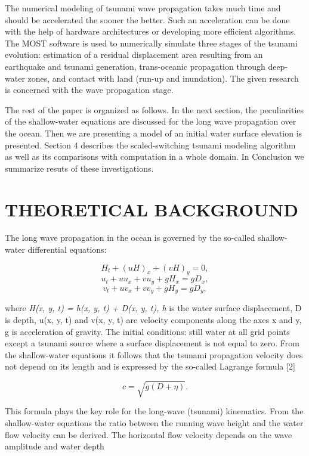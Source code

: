 \documentclass{aip-cp}
\begin{document}
The numerical modeling of tsunami wave propagation takes much time and 
should be accelerated the sooner the better. Such an acceleration can be 
done with the help of hardware architectures or developing more efficient 
algorithms. The MOST software is used to numerically simulate three 
stages of the tsunami evolution: estimation of a residual displacement 
area resulting from an earthquake and tsunami generation, trans-oceanic 
propagation through deep-water zones, and contact with land (run-up and 
inundation). The given research is concerned with the wave propagation 
stage. 

The rest of the paper is organized as follows. In the next section, the
peculiarities of the shallow-water equations are discussed for the long wave propagation 
over the ocean. Then we are presenting a model of an initial water surface elevation
is presented. Section 4 describes the scaled-switching tsunami modeling
algorithm as well as its comparisons with computation in a whole domain. In
Conclusion we summarize resuts of these investigations. 

\section{THEORETICAL BACKGROUND}
The long wave propagation in the ocean is governed by the so-called 
shallow-water differential equations:

\[
H_t + (uH)_x + (vH)_y = 0,
\]
\begin{equation}
\label{eq1}
u_t + uu_x + vu_y + gH_x = gD_x ,
\end{equation}
\[
v_t + uv_x + vv_y + gH_y = gD_y ,
\]

\noindent
where \textit{H(x, y, t) = h(x, y, t) + D(x, y, t), h} is the water surface displacement, D is depth, u(x, y, t) and v(x, y, 
t) are velocity components along the axes x and y, g is acceleration of 
gravity. The initial conditions: still water at all grid points except a 
tsunami source where a surface displacement is not equal to zero. From the 
shallow-water equations it follows that the tsunami propagation velocity 
does not depend on its length and is expressed by the so-called Lagrange 
formula [2]

\begin{equation}
\label{eq2}
c = \sqrt {g(D + \eta )} .
\end{equation}

This formula plays the key role for the long-wave (tsunami) kinematics. From 
the shallow-water equations the ratio between the running wave height and 
the water flow velocity can be derived. The horizontal flow velocity depends 
on the wave amplitude and water depth
\end{document}
